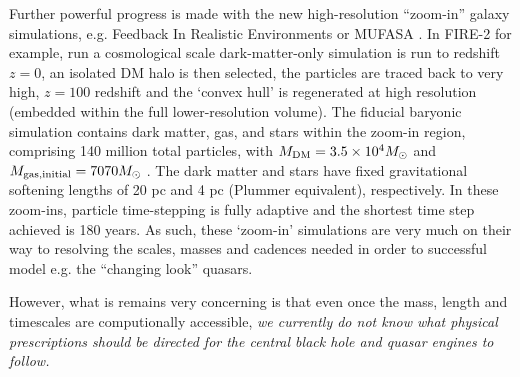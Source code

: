 \smallskip
\smallskip
\noindent
Further powerful progress is made with the new high-resolution ``zoom-in'' galaxy
simulations, 
e.g. Feedback In Realistic Environments \citep[FIRE-2;
][]{Wetzel2016, Hopkins2017} or MUFASA \citep[][]{Dave2016}.
%
In FIRE-2 for example, \citet{Wetzel2016} run a cosmological scale dark-matter-only simulation is run to redshift $z=0$, 
an isolated DM halo is then selected, the particles are traced back to very high, $z=100$ redshift 
and the `convex hull' is regenerated at high resolution (embedded within the full lower-resolution volume). 
%
The fiducial baryonic simulation contains dark
matter, gas, and stars within the zoom-in region, comprising 140
million total particles, with $M_{\rm DM} =3.5\times10^{4} M_{\odot}$ and $M_{\rm gas,initial} = 7070 M_{\odot}$ . 
The dark matter and stars have fixed gravitational softening lengths 
of 20 pc and 4 pc (Plummer equivalent), respectively. 
In these zoom-ins, particle time-stepping is fully adaptive and the shortest time step achieved is 180 years.
As such, these `zoom-in' simulations are very much on their way to resolving the 
scales, masses and cadences needed in order to successful model e.g. the ``changing look'' quasars. 



%
%

\smallskip
\smallskip
\noindent
However, what is remains very concerning is that even once the 
mass, length and timescales are computionally accessible, {\it we 
currently do not know what physical prescriptions should be 
directed for the central black hole and quasar engines to follow.}


